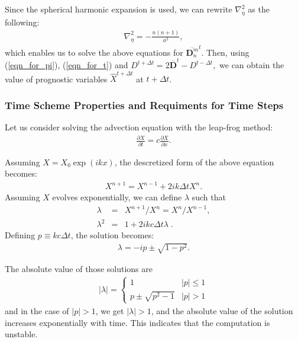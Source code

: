 Since the spherical harmonic expansion is used, we can rewrite
\(\nabla_{\eta}^2\) as the following:
\begin{eqnarray}
\nabla_{\eta}^2=-\frac{n(n+1)}{a^2},
\end{eqnarray}
which enables us to solve the above equations for
\(\overline{ {\mathbf{D}}_n^m }^{t}\). Then, using (\ref{eqn_for_pi}),
(\ref{eqn_for_t}) and
\(D^{t+\Delta t} = 2\overline{ {\mathbf{D}} }^{t} - D^{t-\Delta t},\)
we can obtain the value of prognostic variables \(\hat{X}^{t+\Delta t}\)
at \(t+\Delta t\).

\hypertarget{time-scheme-properties-and-requiments-for-time-steps}{%
\subsubsection{Time Scheme Properties and Requiments for Time
Steps}\label{time-scheme-properties-and-requiments-for-time-steps}}

Let us consider solving the advection equation with the leap-frog
method:
\begin{eqnarray}
  \frac{\partial{X}}{\partial {t}} = c \frac{\partial{X}}{\partial {x}}.
\end{eqnarray}

Assuming \(X = X_0 \exp(ikx)\), the descretized form of the above
equation becomes:
\begin{eqnarray}
  X^{n+1} = X^{n-1} + 2 i k \Delta t X^n.
\end{eqnarray}
Assuming \(X\) evolves exponentially, we can define \(\lambda\) such
that
\begin{eqnarray}
  \lambda &=& X^{n+1}/X^n = X^n/X^{n-1}, \\
  \lambda^2 &=& 1 + 2 i kc \Delta t \lambda \; .
\end{eqnarray}
Defining \(p \equiv kc \Delta t\), the solution becomes:
\begin{eqnarray}
 \lambda = -i p \pm \sqrt{1-p^2}.
\end{eqnarray}

The absolute value of those solutions are
\begin{eqnarray}
  |\lambda| = \left\{
             \begin{array}{ll}
               1 & |p| \le 1 \\
               p \pm \sqrt{p^2-1} & |p| > 1
             \end{array}
             \right.
\end{eqnarray}
and in the case of \(|p|>1\), we get \(|\lambda| > 1\), and the absolute
value of the solution increases exponentially with time. This indicates
that the computation is unstable.

